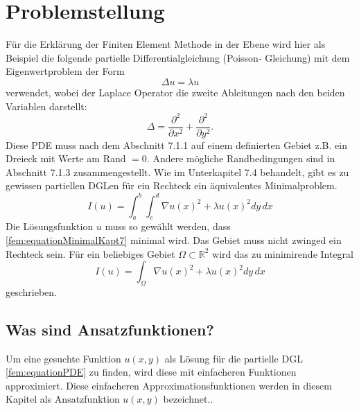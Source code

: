 %
%
%
\section{Problemstellung
\label{fem:section:problemstellung}}
Für die Erklärung der Finiten Element Methode in der Ebene wird hier als Beispiel die folgende partielle Differentialgleichung (Poisson- Gleichung) mit dem Eigenwertproblem der Form 
\begin{equation}
	\Delta u = \lambda u
	\label{fem:equationPDE}
\end{equation}
verwendet, wobei der Laplace Operator die zweite Ableitungen nach den beiden Variablen darstellt:
\begin{equation}
	\Delta = \frac{\partial ^2}{\partial x^2} + \frac{\partial ^2}{\partial y^2}.
\end{equation} 
Diese PDE muss nach dem Abschnitt 7.1.1 auf einem definierten Gebiet z.B. ein Dreieck mit Werte am Rand $= 0$. Andere mögliche Randbedingungen sind in Abschnitt 7.1.3 zusammengestellt. Wie im Unterkapitel 7.4 behandelt, gibt es zu gewissen partiellen DGLen für ein Rechteck ein äquivalentes Minimalproblem.
\begin{equation}
	I(u) = \int_a^b \int_c^d \nabla u(x)^2 + \lambda u(x)^2 dy \, dx
	\label{fem:equationMinimalKapt7}
\end{equation}
Die Lösungsfunktion $u$ muss so gewählt werden, dass \eqref{fem:equationMinimalKapt7} minimal wird. Das Gebiet muss nicht zwinged ein Rechteck sein. Für ein beliebiges Gebiet $\Omega \subset \mathbb{R}^2$ wird das zu minimirende Integral  %
\begin{equation}
	I(u) = \int_{\Omega} \nabla u(x)^2 + \lambda u(x)^2 dy \, dx
	\label{fem:equationMinimalKapt7Alg}
\end{equation}
geschrieben.
\subsection{Was sind Ansatzfunktionen?}
Um eine gesuchte Funktion $u(x,y)$ als Lösung für die partielle DGL \eqref{fem:equationPDE} zu finden, wird diese mit einfacheren Funktionen approximiert. Diese einfacheren Approximationsfunktionen werden in diesem Kapitel als Ansatzfunktion $u(x,y)$ bezeichnet..

